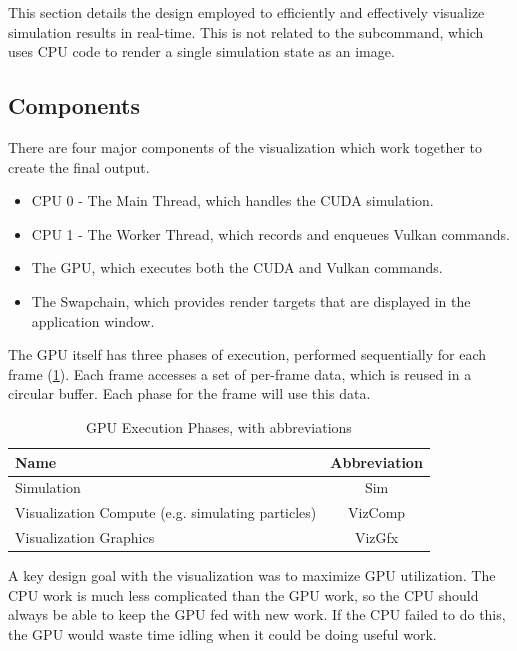This section details the design employed to efficiently and effectively visualize simulation results in real-time.
This is not related to the  subcommand, which uses CPU code to render a single simulation state as an image.

\subsection{Components}
There are four major components of the visualization which work together to create the final output.
\begin{itemize}
    \item CPU 0 - The Main Thread, which handles the CUDA simulation.
    \item CPU 1 - The Worker Thread, which records and enqueues Vulkan commands.
    \item The GPU, which executes both the CUDA and Vulkan commands.
    \item The Swapchain, which provides render targets that are displayed in the application window.
\end{itemize}
The GPU itself has three phases of execution, performed sequentially for each frame (\cref{tab:gpuexecution}).
Each frame accesses a set of per-frame data, which is reused in a circular buffer.
Each phase for the frame will use this data.
\begin{table}[h]
    \centering
    \begin{tabular}{l|c}
    Name & Abbreviation \\
    \hline
    Simulation & Sim \\
    Visualization Compute (e.g. simulating particles) & VizComp \\
    Visualization Graphics & VizGfx \\
    \end{tabular}
    \caption{GPU Execution Phases, with abbreviations}
    \label{tab:gpuexecution}
\end{table}

A key design goal with the visualization was to maximize GPU utilization.
The CPU work is much less complicated than the GPU work, so the CPU should always be able to keep the GPU fed with new work.
If the CPU failed to do this, the GPU would waste time idling when it could be doing useful work.

